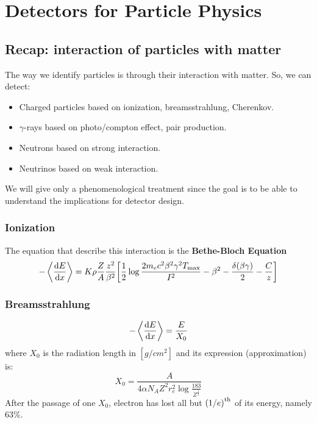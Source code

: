 \documentclass[../../main/main.tex]{subfiles}
\begin{document}
\chapter{Detectors for Particle Physics}


\section{Recap: interaction of particles with matter}
The way we identify particles is through their interaction with matter. So, we can detect:
\begin{itemize}
    \item Charged particles based on ionization, breamsstrahlung, Cherenkov.
    \item \( \gamma \)-rays based on photo/compton effect, pair production.
    \item Neutrons based on strong interaction.
    \item Neutrinos based on weak interaction.
\end{itemize}
We will give only a phenomenological treatment since the goal is to be able to understand the implications for detector design.

\subsection{Ionization}
The equation that describe this interaction is the \textbf{Bethe-Bloch Equation}
\begin{equation}
    - \left\langle \dv{E}{x} \right\rangle
    =
    K \rho \frac{Z}{A} \frac{z^2}{\beta^2}
    \qty[ \frac{1}{2} \log \frac{2 m_e c^2 \beta^2 \gamma^2 T_\mathrm{max}}{I^2} - \beta^2 - \frac{\delta(\beta \gamma)}{2} - \frac{C}{z} ]
    \label{eq:}
\end{equation}

\subsection{Breamsstrahlung}
\begin{equation}
    - \left\langle \dv{E}{x} \right\rangle
    =
    \frac{E}{X_0}
    \label{eq:}
\end{equation}
where \( X_0 \) is the radiation length in \( [\si{g/cm^2}] \) and its expression (approximation) is:
\begin{equation}
    X_0
    =
    \frac{A}{4 \alpha N_A Z^2 r^2_e \log \frac{183}{Z^{\frac{1}{3}}}}
    \label{eq:}
\end{equation}
After the passage of one \( X_0 \), electron has lost all but \( \qty(1/e)^\text{th} \) of its energy, namely 63\%.
\end{document}
